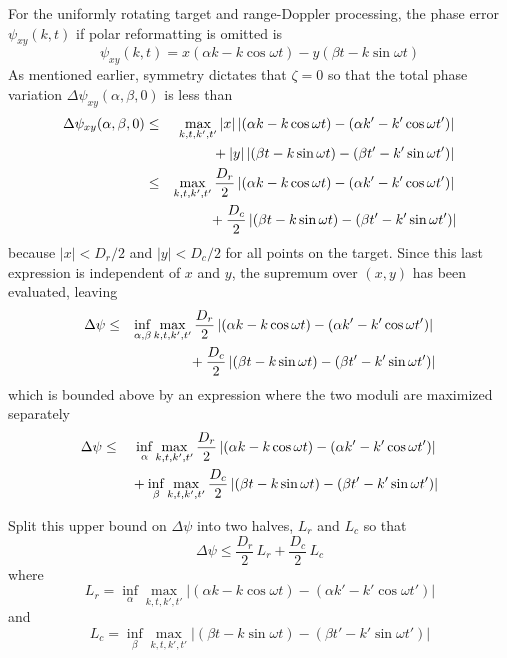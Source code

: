 For the uniformly rotating target and range-Doppler processing, the phase 
error $\psi_{xy}(k,t)$ if polar reformatting is omitted is
\begin{equation}
\psi_{xy}(k,t)=x\left(\alpha k-k\cos\omega t\right)
-y\left(\beta t-k\sin\omega t\right)
\end{equation}
As mentioned earlier, symmetry dictates that $\zeta=0$ so that the total 
phase variation $\Delta\psi_{xy}(\alpha,\beta,0)$ is less than
\begin{eqnarray}
\Delta\psi_{xy}(\alpha,\beta,0)
&\leq&\max_{k,t,k',t'} 
\left|x\right|\left|\left(\alpha k-k\cos\omega t\right)
-\left(\alpha k'-k'\cos\omega t'\right)\right|			{\nonumber}\\
&&{}+\left|y\right|\left|\left(\beta t-k\sin\omega t\right)-
\left(\beta t'-k'\sin\omega t'\right)\right| 			{\nonumber}\\
&\leq&\max_{k,t,k',t'} 
\frac{D_r}{2}\left|\left(\alpha k-k\cos\omega t\right)
-\left(\alpha k'-k'\cos\omega t'\right)\right|			{\nonumber}\\
&&{}+\frac{D_c}{2}\left|\left(\beta t-k\sin\omega t\right)-
\left(\beta t'-k'\sin\omega t'\right)\right| 
\end{eqnarray}
because $\left|x\right|<D_r/2$ and $\left|y\right|<D_c/2$ for all points on
the target.  Since this last expression is independent of $x$ and $y$, the 
supremum over $(x,y)$ has been evaluated, leaving
\begin{eqnarray}
\Delta\psi&\leq&\inf_{\alpha,\beta}\max_{k,t,k',t'} 
\frac{D_r}{2}\left|\left(\alpha k-k\cos\omega t\right)
-\left(\alpha k'-k'\cos\omega t'\right)\right|			{\nonumber}\\
&&{}+\frac{D_c}{2}\left|\left(\beta t-k\sin\omega t\right)-
\left(\beta t'-k'\sin\omega t'\right)\right| 
\end{eqnarray}
which is bounded above by an expression where the two moduli are maximized
separately
\begin{eqnarray}
\Delta\psi&\leq&\inf_{\alpha}\max_{k,t,k',t'} 
\frac{D_r}{2}\left|\left(\alpha k-k\cos\omega t\right)
-\left(\alpha k'-k'\cos\omega t'\right)\right|			{\nonumber}\\
&&{}+\inf_{\beta}\max_{k,t,k',t'} 
\frac{D_c}{2}\left|\left(\beta t-k\sin\omega t\right)-
\left(\beta t'-k'\sin\omega t'\right)\right| 
\end{eqnarray}

Split this upper bound on $\Delta\psi$ into two halves, $L_r$ and $L_c$ so
that
\begin{equation}
\Delta\psi\leq \frac{D_r}{2}\,L_r+\frac{D_c}{2}\,L_c
\end{equation}
where
\begin{equation}
L_r=\inf_{\alpha}\max_{k,t,k',t'} \left|\left(\alpha k-k\cos\omega t\right)
-\left(\alpha k'-k'\cos\omega t'\right)\right|
\end{equation}
and
\begin{equation}
L_c=\inf_{\beta}\max_{k,t,k',t'} \left|\left(\beta t-k\sin\omega t\right)-
\left(\beta t'-k'\sin\omega t'\right)\right| 
\end{equation}

